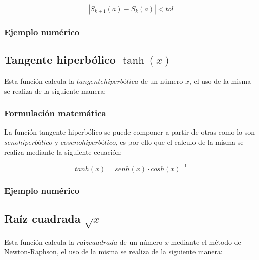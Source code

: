 \documentclass[10pt,a4paper]{article}
\begin{document}
	\begin{equation}\label{key17}
		\left\lvert S_{k+1}(a) - S_{k}(a) \right\lvert < tol
	\end{equation}
	
	\subsubsection{Ejemplo numérico}
	
	\subsection{Tangente hiperbólico $\tanh(x)$}
	
	Esta función calcula la $tangente hiperbólica$ de un número $x$, el uso de la misma se realiza de la siguiente manera:
	
	\begin{center}
	\end{center}
	
	\subsubsection{Formulación matemática}
	
	La función tangente hiperbólico se puede componer a partir de otras como lo son $seno hiperbólico$ y $coseno hiperbólico$, es por ello que el calculo de la misma se realiza mediante la siguiente ecuación:
	
	\begin{equation}\label{key18}
		tanh(x) = senh(x)\cdot cosh(x)^{-1}
	\end{equation}
	
	\subsubsection{Ejemplo numérico}
	
	\subsection{Raíz cuadrada $\sqrt{x}$}
	
	Esta función calcula la $raíz cuadrada$ de un número $x$ mediante el método de Newton-Raphson, el uso de la misma se realiza de la siguiente manera:
	
	\begin{center}
	\end{center}
	
\end{document}
